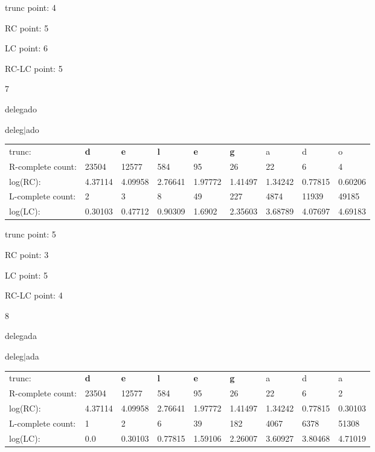 \documentclass{article}
\begin{document}
trunc point: 4

RC point: 5

LC point: 6

RC-LC point: 5

\vspace{3em}



7

delegado

deleg$|$ado

\vspace{1em}

\begin{tabular}{l|llllllll}

trunc: & {\color{red}\bf d} & {\color{red}\bf e} & {\color{red}\bf l} & {\color{red}\bf e} & {\color{red}\bf g} & a & d & o \\ 
R-complete count: & 23504 & 12577 & 584 & 95 & 26 & 22 & 6 & 4 \\ 
log(RC): & 4.37114 & 4.09958 & 2.76641 & 1.97772 & 1.41497 & 1.34242 & 0.77815 & 0.60206 \\ 
L-complete count: & 2 & 3 & 8 & 49 & 227 & 4874 & 11939 & 49185 \\ 
log(LC): & 0.30103 & 0.47712 & 0.90309 & 1.6902 & 2.35603 & 3.68789 & 4.07697 & 4.69183 \\ 
\end{tabular}

trunc point: 5

RC point: 3

LC point: 5

RC-LC point: 4

\vspace{3em}



8

delegada

deleg$|$ada

\vspace{1em}

\begin{tabular}{l|llllllll}

trunc: & {\color{red}\bf d} & {\color{red}\bf e} & {\color{red}\bf l} & {\color{red}\bf e} & {\color{red}\bf g} & a & d & a \\ 
R-complete count: & 23504 & 12577 & 584 & 95 & 26 & 22 & 6 & 2 \\ 
log(RC): & 4.37114 & 4.09958 & 2.76641 & 1.97772 & 1.41497 & 1.34242 & 0.77815 & 0.30103 \\ 
L-complete count: & 1 & 2 & 6 & 39 & 182 & 4067 & 6378 & 51308 \\ 
log(LC): & 0.0 & 0.30103 & 0.77815 & 1.59106 & 2.26007 & 3.60927 & 3.80468 & 4.71019 \\ 
\end{tabular}
\end{document}
